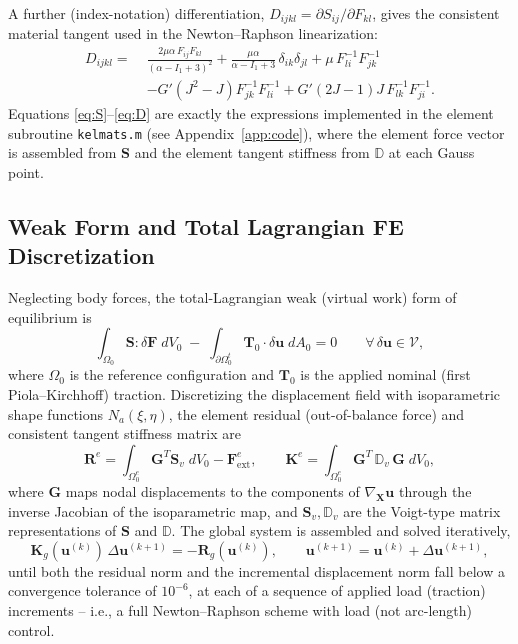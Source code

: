 \documentclass[11pt,a4paper]{article}
\newcommand{\bF}{\mathbf{F}}
\newcommand{\bS}{\mathbf{S}}
\newcommand{\bD}{\mathbb{D}}
\begin{document}
A further (index-notation) differentiation, $D_{ijkl} = \partial S_{ij}/\partial F_{kl}$, gives the consistent
material tangent used in the Newton--Raphson linearization:
\begin{equation}
\begin{aligned}
D_{ijkl} = \;& \frac{2\mu\alpha \,F_{ij}F_{kl}}{(\alpha-I_1+3)^{2}}
+ \frac{\mu\alpha}{\alpha - I_1+3}\,\delta_{ik}\delta_{jl}
+ \mu\, F^{-1}_{li}F^{-1}_{jk} \\
& - G'\left(J^{2}-J\right)F^{-1}_{jk}F^{-1}_{li}
+ G'\left(2J-1\right)J\,F^{-1}_{lk}F^{-1}_{ji}.
\end{aligned}
\label{eq:D}
\end{equation}
Equations \eqref{eq:S}--\eqref{eq:D} are exactly the expressions implemented in the element subroutine
\texttt{kelmats.m} (see Appendix~\ref{app:code}), where the element force vector is assembled from $\bS$ and
the element tangent stiffness from $\bD$ at each Gauss point.

\subsection{Weak Form and Total Lagrangian FE Discretization}
Neglecting body forces, the total-Lagrangian weak (virtual work) form of equilibrium is
\begin{equation}
\int_{\Omega_0} \bS : \delta \bF \; dV_0 \;-\; \int_{\partial\Omega_0^{t}} \mathbf{T}_0\cdot\delta\mathbf{u}\;dA_0 = 0
\qquad \forall\, \delta\mathbf{u} \in \mathcal{V},
\end{equation}
where $\Omega_0$ is the reference configuration and $\mathbf{T}_0$ is the applied nominal (first
Piola--Kirchhoff) traction. Discretizing the displacement field with isoparametric shape functions
$N_a(\xi,\eta)$, the element residual (out-of-balance force) and consistent tangent stiffness matrix are
\begin{equation}
\mathbf{R}^{e} = \int_{\Omega_0^{e}} \mathbf{G}^{T}\mathbf{S}_v \; dV_0 - \mathbf{F}_{\text{ext}}^{e},
\qquad
\mathbf{K}^{e} = \int_{\Omega_0^{e}} \mathbf{G}^{T}\,\bD_v\,\mathbf{G}\; dV_0,
\end{equation}
where $\mathbf{G}$ maps nodal displacements to the components of $\nabla_{\mathbf X}\mathbf u$ through the
inverse Jacobian of the isoparametric map, and $\mathbf{S}_v,\bD_v$ are the Voigt-type matrix
representations of $\bS$ and $\bD$. The global system is assembled and solved iteratively,
\begin{equation}
\mathbf{K}_g(\mathbf{u}^{(k)})\,\Delta\mathbf{u}^{(k+1)} = -\mathbf{R}_g(\mathbf{u}^{(k)}), \qquad
\mathbf{u}^{(k+1)} = \mathbf{u}^{(k)}+\Delta\mathbf{u}^{(k+1)},
\end{equation}
until both the residual norm and the incremental displacement norm fall below a convergence tolerance of
$10^{-6}$, at each of a sequence of applied load (traction) increments -- i.e., a full Newton--Raphson
scheme with load (not arc-length) control.
\end{document}
